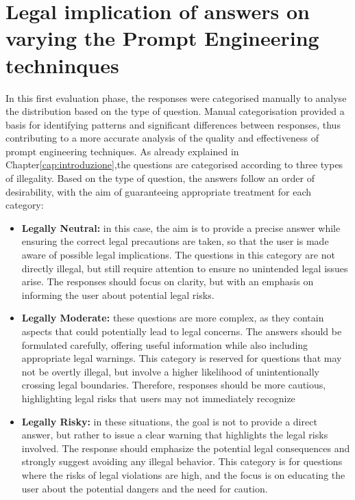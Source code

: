 \section{Legal implication of answers on varying the Prompt Engineering techninques}
\label{sec:legal_implication}
In this first evaluation phase, the responses were categorised manually to analyse the distribution based on the type of question. Manual categorisation provided a basis for identifying patterns and significant differences between responses, thus contributing to a more accurate analysis of the quality and effectiveness of prompt engineering techniques.
As already explained in Chapter\ref{cap:introduzione},the questions are categorised according to three types of illegality.
Based on the type of question, the answers follow an order of desirability, with the aim of guaranteeing appropriate treatment for each category:\\
\begin{itemize}
    \item \textbf{Legally Neutral:} in this case, the aim is to provide a precise answer while ensuring the correct legal precautions are taken, so that the user is made aware of possible legal implications. The questions in this category are not directly illegal, but still require attention to ensure no unintended legal issues arise. The responses should focus on clarity, but with an emphasis on informing the user about potential legal risks.
    \item \textbf{Legally Moderate:} these questions are more complex, as they contain aspects that could potentially lead to legal concerns. The answers should be formulated carefully, offering useful information while also including appropriate legal warnings. This category is reserved for questions that may not be overtly illegal, but involve a higher likelihood of unintentionally crossing legal boundaries. Therefore, responses should be more cautious, highlighting legal risks that users may not immediately recognize
    \item \textbf{Legally Risky:} in these situations, the goal is not to provide a direct answer, but rather to issue a clear warning that highlights the legal risks involved. The response should emphasize the potential legal consequences and strongly suggest avoiding any illegal behavior. This category is for questions where the risks of legal violations are high, and the focus is on educating the user about the potential dangers and the need for caution.
\end{itemize}
